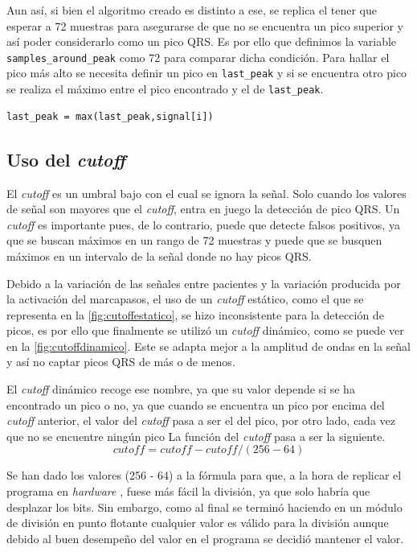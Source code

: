 Aun así, si bien el algoritmo creado es distinto a ese, se replica el tener que esperar a 72 muestras para asegurarse de que no se encuentra un pico superior y así poder considerarlo como un pico QRS. Es por ello que definimos la variable \lstinline|samples_around_peak| como 72 para comparar dicha condición. Para hallar el pico más alto se necesita definir un pico en \lstinline{last_peak} y si se encuentra otro pico se realiza el máximo entre el pico encontrado y el de \lstinline{last_peak}.

\lstset{language=python, breaklines=true, basicstyle=\footnotesize}
\begin{lstlisting}[frame=single]
last_peak = max(last_peak,signal[i])
\end{lstlisting}
\subsection{Uso del \textit{cutoff}}
El \textit{cutoff} es un umbral bajo con el cual se ignora la señal. Solo cuando los valores de señal son mayores que el \textit{cutoff}, entra en juego la detección de pico QRS. Un \textit{cutoff} es importante pues, de lo contrario, puede que detecte falsos positivos, ya que se buscan máximos en un rango de 72 muestras y puede que se busquen máximos en un intervalo de la señal donde no hay picos QRS.

Debido a la variación de las señales entre pacientes y la variación producida por la activación del marcapasos, el uso de un \textit{cutoff} estático, como el que se representa en la \cref{fig:cutoffestatico}, se hizo inconsistente para la detección de picos, es por ello que finalmente se utilizó un \textit{cutoff} dinámico, como se puede ver en la \cref{fig:cutoffdinamico}. Este se adapta mejor a la amplitud de ondas en la señal y así no captar picos QRS de más o de menos.

El \textit{cutoff} dinámico recoge ese nombre, ya que su valor depende si se ha encontrado un pico o no, ya que cuando se encuentra un pico por encima del \textit{cutoff} anterior, el valor del \textit{cutoff} pasa a ser el del pico, por otro lado, cada vez que no se encuentre ningún pico La función del \textit{cutoff} pasa a ser la siguiente.
\[cutoff = cutoff - cutoff/(256 - 64)\]

Se han dado los valores (256 - 64) a la fórmula para que, a la hora de replicar el programa en  \textit{hardware} , fuese más fácil la división, ya que solo habría que desplazar los bits. Sin embargo, como al final se terminó haciendo en un módulo de división en punto flotante cualquier valor es válido para la división aunque debido al buen desempeño del valor en el programa se decidió mantener el valor.

